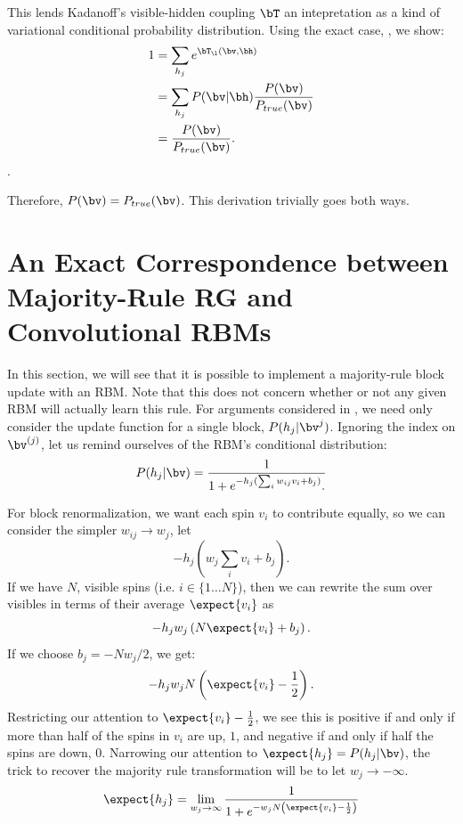 This lends Kadanoff's visible-hidden coupling $\bT$ an intepretation
as a kind of variational conditional probability distribution.  Using the
exact case, , we show:
\begin{align}
  1 &= \sum_{h_j}e^{\bT_\l(\bv,\bh)} \\
    &= \sum_{h_j} P(\bv| \bh) \frac{P(\bv)}{P_{true}(\bv)} \\
    &=\frac{P(\bv)}{P_{true}(\bv)}.
\end{align}.

Therefore, $P(\bv)=P_{true}(\bv)$. This derivation trivially goes both ways.

\section{An Exact Correspondence between Majority-Rule RG and
  Convolutional RBMs}\label{sec:majority-rule-rbm}
In this section, we will see that it is possible to implement a
majority-rule block update with an RBM\@. Note that this does not
concern whether or not any given RBM will actually learn this
rule. For arguments considered in , we need only
consider the update function for a single block, $P(h_j\rvert\bv^{j})$. Ignoring the index on
$\bv^{(j)}$, let us remind ourselves of the RBM's conditional
distribution:
\begin{equation}%
  P(h_j\rvert \bv)=\frac{1}{1+e^{-h_j(\sum_i w_{ij} v_i +b_j )}.}
\end{equation}%

For block renormalization, we want each spin
$v_i$ to contribute equally, so we can consider the simpler
$w_{ij}\rightarrow w_j$, let
\begin{equation}%
  -h_j(w_j\sum_i v_i +b_j ).
\end{equation}%
If we have $N$, visible spins (i.e.
$i\in\{1\ldots N\}$), then we can rewrite the sum over visibles in
terms of their average $\expect{v_i}$ as
\begin{equation}%
  -h_j w_j\left(N \expect{v_i} +b_j \right).
\end{equation}%
If we choose $b_j=-N w_j /2$, we get:%
\begin{equation}%
  -h_j w_j N \left(\expect{v_i}-\frac{1}{2}\right).
\end{equation}%
Restricting our attention to
$\expect{v_i}-\frac{1}{2}$, we see this is positive if and only if
more than half of the spins in $v_i$ are up,
$1$, and negative if and only if half the spins are down,
$0$. Narrowing our attention to $\expect{h_j}=P(h_j\rvert \bv)$, the trick
to recover the majority rule transformation will be to let
$w_j\rightarrow-\infty$.
\begin{equation}%
  \expect{h_j}=\lim_{w_j\rightarrow\infty}\frac{1}{1+e^{-w_j N \left(\expect{v_i}-\frac{1}{2}\right)}}
\end{equation}%

